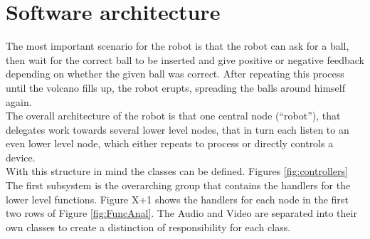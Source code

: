 \documentclass[11pt,twoside,a4paper]{report}
\begin{document}
\section{Software architecture}
The most important scenario for the robot is that the robot can ask for a ball, then wait for the correct ball to be inserted and give positive or negative feedback depending on whether the given ball was correct. After repeating this process until the volcano fills up, the robot erupts, spreading the balls around himself again. \\
The overall architecture of the robot is that one central node (“robot”), that delegates work towards several lower level nodes, that in turn each listen to an even lower level node, which either repeats to process or directly controls a device. \\
With this structure in mind the classes can be defined. Figures \ref{fig:controllers} The first subsystem is the overarching group that contains the handlers for the lower level functions. Figure X+1 shows the handlers for each node in the first two rows of Figure \ref{fig:FuncAnal}. The Audio and Video are separated into their own classes to create a distinction of responsibility for each class. 
\end{document}

